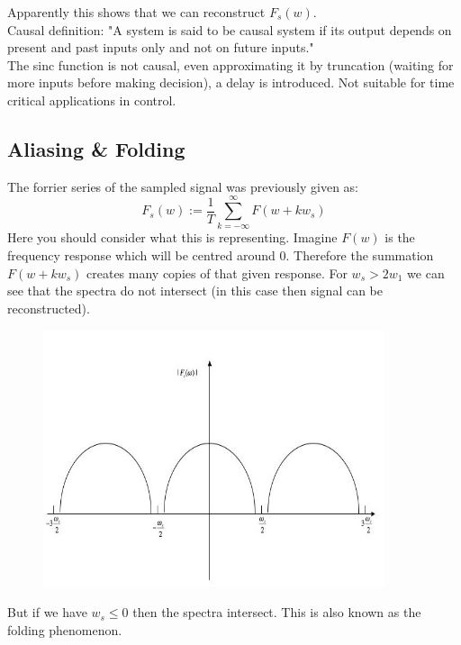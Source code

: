 \documentclass[a4paper,11pt]{article}
\begin{document}
	Apparently this shows that we can reconstruct $F_s(w)$.\\
	
	Causal definition: "A system is said to be causal system if its output depends on present and past inputs only and not on future inputs."\\
	The sinc function is not causal, even approximating it by truncation (waiting for more inputs before making decision), a delay is introduced. Not suitable for time critical applications in control.\\
	
	\subsection{Aliasing \& Folding}
	The forrier series of the sampled signal was previously given as:
	 \begin{equation}
		F_s(w):=\frac{1}{T}\sum\limits_{k=-\infty}^{\infty}F(w+kw_s)
	\end{equation}
	Here you should consider what this is representing. Imagine $F(w)$ is the frequency response which will be centred around 0. Therefore the summation $F(w+kw_s)$ creates many copies of that given response. For $w_s>2w_1$ we can see that the spectra do not intersect (in this case then signal can be reconstructed).
	\FloatBarrier
	\begin{figure}[htp]
		\centering
		\includegraphics[scale=0.5]{images/aliasing_and_folding_1}
	\end{figure}
	But if we have $w_s\leq0$ then the spectra intersect. This is also known as the folding phenomenon. 
	
\end{document}
